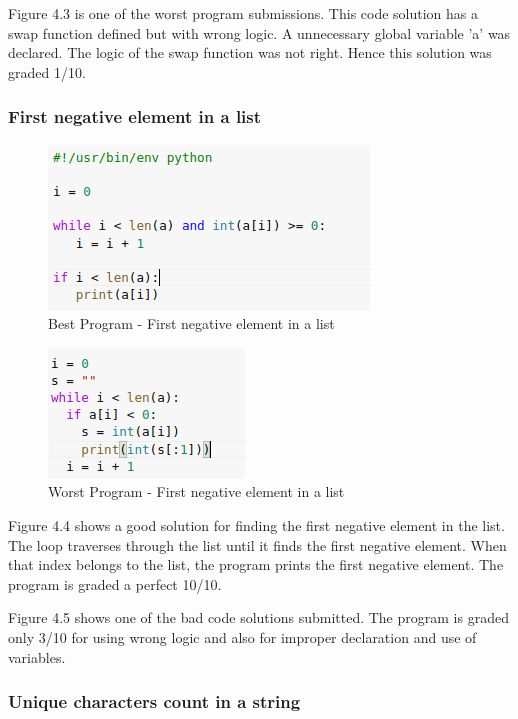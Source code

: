 Figure 4.3 is one of the worst program submissions. This code solution has a swap function defined but with wrong logic. A unnecessary global variable 'a' was declared. The logic of the swap function was not right. Hence this solution was graded 1/10.

\newpage
\subsubsection{First negative element in a list}

\begin{figure}[h]
\centering
\includegraphics[]{./figures/best_fn.png}
\caption{Best Program - First negative element in a list}
\label{fig1}
\end{figure}

\begin{figure}[h]
\centering
\includegraphics[scale=1.1]{./figures/worst_fn.png}
\caption{Worst Program - First negative element in a list}
\label{fig1}
\end{figure}

Figure 4.4 shows a good solution for finding the first negative element in the list. The loop traverses through the list until it finds the first negative element. When that index belongs to the list, the program prints the first negative element. The program is graded a perfect 10/10.

Figure 4.5 shows one of the bad code solutions submitted. The program is graded only 3/10 for using wrong logic and also for improper declaration and use of variables.

\newpage

\subsubsection{Unique characters count in a string}

